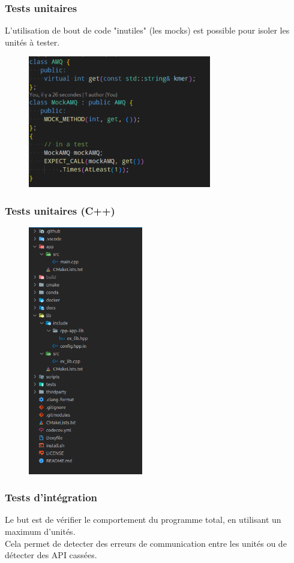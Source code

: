 \documentclass{beamer}
\begin{document}
\begin{frame}
    \frametitle{Tests unitaires}
    L'utilisation de bout de code "inutiles" (les mocks) est possible pour isoler les unités à tester.
    \begin{figure}
        \includegraphics[width=8cm]{img/mock.png}
    \end{figure}
\end{frame}

\begin{frame}
    \frametitle{Tests unitaires (C++)}
    \begin{figure}
        \includegraphics[width=5cm]{img/arbre.png}
    \end{figure}
\end{frame}

\begin{frame}
    \frametitle{Tests d'intégration}
    Le but est de vérifier le comportement du programme total, en utilisant un maximum d'unités.\\
    Cela permet de detecter des erreurs de communication entre les unités ou de détecter des API cassées.\\
\end{frame}
\end{document}
